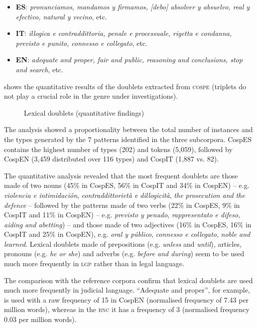 \documentclass[output=paper]{LSP/langsci}
\begin{document}
\begin{itemize}
\item \textbf{ES}: \textit{pronunciamos, mandamos y firmamos, [debo] absolver y absuelvo, real y efectivo, natural y vecino}, etc.
\item \textbf{IT}: \textit{illogica e contraddittoria, penale e processuale, rigetta e condanna, previsto e punito, connesso e collegato}, etc.
\item \textbf{EN}: \textit{adequate and proper, fair and public, reasoning and conclusions, stop and search}, etc.
\end{itemize}

 shows the quantitative results of the doublets extracted from \textsc{cospe} (triplets do not play a crucial role in the genre under investigations).

\begin{figure}

\caption{Lexical doublets (quantitative findings)} \label{fig:6:2}
\end{figure}

The analysis showed a proportionality between the total number of instances and the types generated by the 7 patterns identified in the three subcorpora. CospES contains the highest number of types (202) and tokens (5,059), followed by CospEN (3,459 distributed over 116 types) and CospIT (1,887 vs. 82).

The quantitative analysis revealed that the most frequent doublets are those made of two nouns (45\% in CospES, 56\% in CospIT and 34\% in CospEN) – e.g. \textit{violencia e intimidación}, \textit{contraddittorietà e dillogicità}, \textit{the prosecution and the defence} – followed by the patterns made of two verbs (22\% in CospES, 9\% in CospIT and 11\% in CospEN) – e.g. \textit{previsto y penado}, \textit{rappresentato e difeso}, \textit{aiding and abetting}) – and those made of two adjectives (16\% in CospES, 16\% in CospIT and 25\% in CospEN), e.g. \textit{oral y público}, \textit{connesso e collegato}, \textit{noble and learned}. Lexical doublets made of prepositions (e.g. \textit{unless} and \textit{until}), articles, pronouns (e.g. \textit{he or she}) and adverbs (e.g. \textit{before and during}) seem to be used much more frequently in \textsc{lgp} rather than in legal language.

The comparison with the reference corpora confirm that lexical doublets are used much more frequently in judicial language. “Adequate and proper”, for example, is used with a raw frequency of 15 in CospEN (normalised frequency of 7.43 per million words), whereas in the \textsc{bnc} it has a frequency of 3 (normalised frequency 0.03 per million words).
\end{document}
